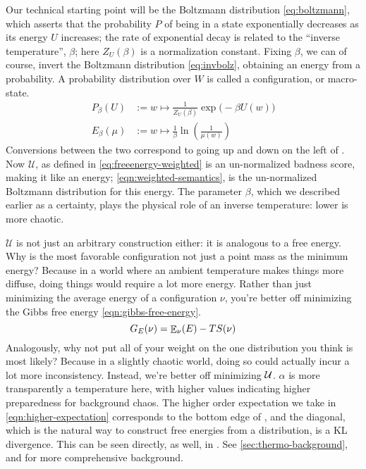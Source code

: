 \documentclass{article}
\numberwithin{equation}{section}
\begin{document}
\begin{notfocus}
	Our technical starting point will be the Boltzmann distribution \eqref{eq:boltzmann}, which asserts that the probability $P$ of being in a state exponentially decreases as its energy $U$ increases; the rate of exponential decay is related to the ``inverse temperature'', $\beta$; here $Z_U(\beta)$ is a normalization constant. Fixing $\beta$, we can of course, invert the Boltzmann distribution \eqref{eq:invbolz}, obtaining an energy from a probability. A probability distribution over $W$ is called a configuration, or macro-state.
 	\begin{align}
	 P_{\beta}(U) &:= w \mapsto  \frac{1}{Z_U(\beta)}\exp\Big(-\beta U(w)\Big) \label{eq:boltzmann} \\
 		E_{\beta}(\mu) &:= w \mapsto \frac{1}{\beta} \ln \left(\frac{1}{\mu(w)}\right) \label{eq:invbolz}
 	\end{align}
 	Conversions between the two correspond to going up and down on the left of . 
 	Now $\mathcal U$, as defined in \eqref{eq:freeenergy-weighted} is an un-normalized badness score, making it like an energy; \eqref{eqn:weighted-semantics}, is the un-normalized Boltzmann distribution for this energy. The parameter $\beta$, which we described earlier as a certainty, plays the physical role of an inverse temperature: lower is more chaotic. 
 	
 	$\mathcal U$ is not just an arbitrary construction either: it is analogous to a free energy. Why is the most favorable configuration not just a point mass as the minimum energy? Because in a world where an ambient temperature makes things more diffuse, doing things would require a lot more energy. Rather than just minimizing the average energy of a configuration $\nu$, you're better off minimizing the Gibbs free energy \eqref{eqn:gibbs-free-energy}. 
 	\begin{equation}
 		G_E(\nu) = {\mathop{\mathbb E}}_\nu( E )  - T S(\nu) \label{eqn:gibbs-free-energy}
 	\end{equation}
 	Analogously, why not put all of your weight on the one distribution you think is most likely? Because in a slightly chaotic world, doing so could actually incur a lot more inconsistency. Instead, we're better off minimizing $\cal U$. $\alpha$ is more transparently a temperature here, with higher values indicating higher preparedness for background chaos. The higher order expectation we take in \eqref{eqn:higher-expectation} corresponds to the bottom edge of , and the diagonal, which is the natural way to construct free energies from a distribution, is a KL divergence. This can be seen directly, as well, in .
	See \ref{sec:thermo-background}, and \parencite{bethe,friston} for more comprehensive background. %
	

\end{notfocus}
\end{document}
